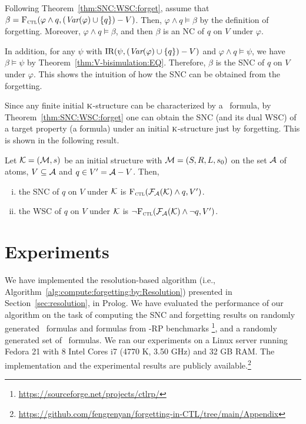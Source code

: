 \documentclass[twoside,11pt]{article}
\begin{document}
	Following Theorem~\ref{thm:SNC:WSC:forget}, assume that $\beta = {\textsc{F}_{\textsc{ctl}}}(\varphi \wedge q, (\textit{Var}(\varphi) \cup \{q\})- V)$.  Then, $\varphi \wedge q \models \beta$  by the definition of forgetting.
	Moreover,  $\varphi \wedge q \models \beta$,  and then $\beta$ is an NC of $q$ on $V$ under $\varphi$.
	
	In addition, for any $\psi$ with $\textrm{IR}(\psi, (\textit{Var}(\varphi) \cup \{q\})- V)$ and $\varphi \wedge q \models \psi$,
	we have $\beta \models \psi$ by  Theorem~\ref{thm:V-bisimulation:EQ}.
	Therefore, $\beta$ is the SNC of $q$ on $V$ under $\varphi$. This shows the intuition of how the SNC can be obtained from the forgetting.
	
	Since any finite initial $\textsc{k}$-structure can be characterized by a \CTL\ formula, by  Theorem~\ref{thm:SNC:WSC:forget} one can obtain the SNC (and its dual WSC) of a target property (a formula) under an initial $\textsc{k}$-structure just by forgetting. This is shown in the following result.
	\begin{theorem}\label{thm:inK:SNC}
		Let ${\cal K}= ({\cal M}, s)$ be an initial structure with ${\cal M}=(S,R,L,s_0)$ on the set ${\cal A}$ of atoms, $V \subseteq {\cal A}$ and $q\in V' = {\cal A} - V$. Then,
		\begin{enumerate}[(i)]
			\item the SNC of $q$ on $V$ under ${\cal K}$ is ${\textsc{F}_{\textsc{ctl}}}({\cal F}_{{\cal A}}({\cal K}) \wedge q, V')$.
			\item the WSC of $q$ on $V$ under ${\cal K}$ is $\neg {\textsc{F}_{\textsc{ctl}}}({\cal F}_{{\cal A}}({\cal K}) \wedge \neg q, V')$.
		\end{enumerate}
	\end{theorem}
	
	
	
	
	\section{Experiments}
	We have implemented the resolution-based algorithm (i.e., Algorithm~\ref{alg:compute:forgetting:by:Resolution}) presented in Section~\ref{sec:resolution}, in Prolog.
	We have evaluated the performance of our algorithm on the task of computing the SNC and forgetting results on randomly generated \CTL\ formulas and formulas from  \CTL-RP benchmarks \footnote{\url{https://sourceforge.net/projects/ctlrp/}}, and a randomly generated set of \CTL\ formulas. We ran our experiments on a Linux server running Fedora 21 with 8 Intel Cores i7 (4770 K, 3.50 GHz) and 32 GB RAM.
	The implementation and the experimental results  are publicly available.\footnote{ \url{https://github.com/fengrenyan/forgetting-in-CTL/tree/main/Appendix}}
	
\end{document}
